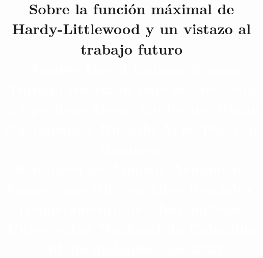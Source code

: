   \skip{}\baselineskip
\def\baselinestretch{1.05}
\parindent0pt

\def\thepage{}

\renewcommand{\footnoterule}{\textcolor{blue}{\rule{0.587\columnwidth}{0.02in}}\vspace*{5mm}}
\title{\color{White}\bfseries {\huge{Sobre la función máximal de Hardy-Littlewood y un vistazo al trabajo futuro}}\\\
	\normalsize\textcolor{White}{\huge{Andrés David Cadena Simons}} \\
	\textcolor{White}{\large{Trabajo realizado bajo la dirección del profesor Oscar Guillermo Riaño Castañeda y Ricardo Ariel Pastrán Ramírez.}} \\\
	\normalsize \textcolor{White}{\large{Semillero de Análisis Armónico y Ecuaciones Diferenciales Parciales, Departamento de Matemáticas, Universidad Nacional de Colombia}}\\\
	\textcolor{White}{\large{01 de diciembre de 2023}}\\\    
}
\author{}
\date{}
\advance
{}
\columnsep=2cm %
